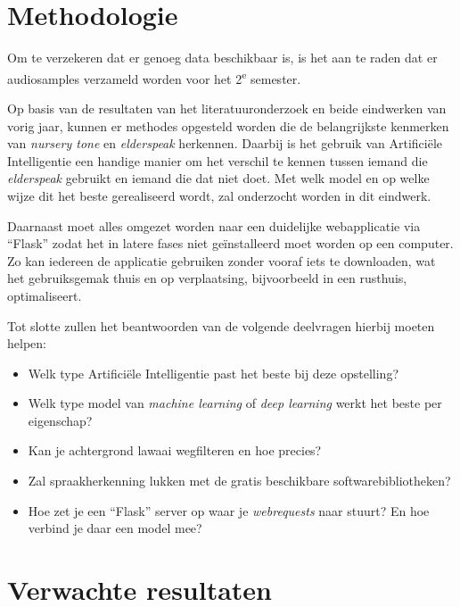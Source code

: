 \section{Methodologie}
\label{sec:methodologie}

Om te verzekeren dat er genoeg data beschikbaar is, is het aan te raden dat er audiosamples verzameld worden voor het 2\textsuperscript{e} semester.

Op basis van de resultaten van het literatuuronderzoek en beide eindwerken van vorig jaar, kunnen er methodes opgesteld worden die de belangrijkste kenmerken van \textit{nursery tone} en \textit{elderspeak} herkennen.
Daarbij is het gebruik van Artificiële Intelligentie een handige manier om het verschil te kennen tussen iemand die \textit{elderspeak} gebruikt en iemand die dat niet doet. Met welk model en op welke wijze dit het beste gerealiseerd wordt, zal onderzocht worden in dit eindwerk.

Daarnaast moet alles omgezet worden naar een duidelijke webapplicatie via ``Flask'' zodat het in latere fases niet geïnstalleerd moet worden op een computer. Zo kan iedereen de applicatie gebruiken zonder vooraf iets te downloaden, wat het gebruiksgemak thuis en op verplaatsing, bijvoorbeeld in een rusthuis, optimaliseert.

Tot slotte zullen het beantwoorden van de volgende deelvragen hierbij moeten helpen:
\begin{itemize}
	\item Welk type Artificiële Intelligentie past het beste bij deze opstelling?
	\item Welk type model van \textit{machine learning} of \textit{deep learning} werkt het beste per eigenschap?
	\item Kan je achtergrond lawaai wegfilteren en hoe precies?
	\item Zal spraakherkenning lukken met de gratis beschikbare softwarebibliotheken?
	\item Hoe zet je een ``Flask'' server op waar je \textit{webrequests} naar stuurt? En hoe verbind je daar een model mee?
\end{itemize}


\section{Verwachte resultaten}
\label{sec:verwachte_resultaten}


